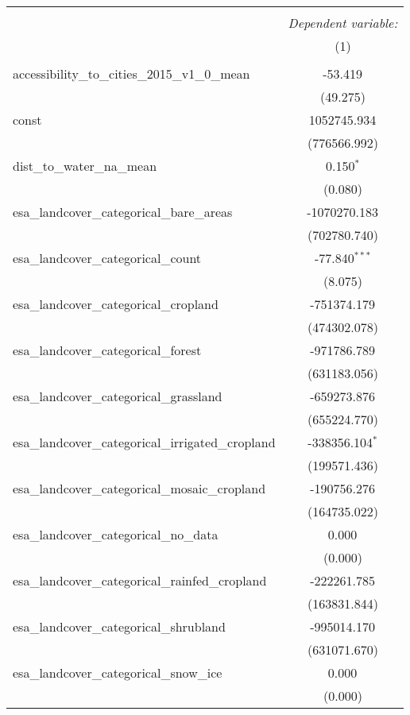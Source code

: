 \begin{table}[!htbp] \centering
\begin{tabular}{@{\extracolsep{5pt}}lc}
\\[-1.8ex]\hline
\hline \\[-1.8ex]
& \multicolumn{1}{c}{\textit{Dependent variable:}} \
\cr \cline{1-2}
\\[-1.8ex] & (1) \\
\hline \\[-1.8ex]
 accessibility_to_cities_2015_v1_0_mean & -53.419$^{}$ \\
  & (49.275) \\
 const & 1052745.934$^{}$ \\
  & (776566.992) \\
 dist_to_water_na_mean & 0.150$^{*}$ \\
  & (0.080) \\
 esa_landcover_categorical_bare_areas & -1070270.183$^{}$ \\
  & (702780.740) \\
 esa_landcover_categorical_count & -77.840$^{***}$ \\
  & (8.075) \\
 esa_landcover_categorical_cropland & -751374.179$^{}$ \\
  & (474302.078) \\
 esa_landcover_categorical_forest & -971786.789$^{}$ \\
  & (631183.056) \\
 esa_landcover_categorical_grassland & -659273.876$^{}$ \\
  & (655224.770) \\
 esa_landcover_categorical_irrigated_cropland & -338356.104$^{*}$ \\
  & (199571.436) \\
 esa_landcover_categorical_mosaic_cropland & -190756.276$^{}$ \\
  & (164735.022) \\
 esa_landcover_categorical_no_data & 0.000$^{}$ \\
  & (0.000) \\
 esa_landcover_categorical_rainfed_cropland & -222261.785$^{}$ \\
  & (163831.844) \\
 esa_landcover_categorical_shrubland & -995014.170$^{}$ \\
  & (631071.670) \\
 esa_landcover_categorical_snow_ice & 0.000$^{}$ \\
  & (0.000) \\

\end{tabular}
\end{table}
